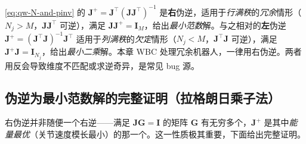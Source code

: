\begin{note}\label{note:qw-left-right}
\cref{eq:qw-N-and-pinv} 的 $\boldsymbol{J}^+=\boldsymbol{J}^\top(\boldsymbol{J}\boldsymbol{J}^\top)^{-1}$ 是\textbf{右}伪逆，适用于\emph{行满秩}的\emph{冗余}情形（$N_j>M$，$\boldsymbol{J}\boldsymbol{J}^\top$ 可逆），满足 $\boldsymbol{J}\boldsymbol{J}^+=\mathbf{I}_M$，给出\emph{最小范数}解。与之相对的\textbf{左}伪逆 $\boldsymbol{J}^+=(\boldsymbol{J}^\top\boldsymbol{J})^{-1}\boldsymbol{J}^\top$ 适用于\emph{列满秩}的\emph{欠定}情形（$N_j<M$，$\boldsymbol{J}^\top\boldsymbol{J}$ 可逆），满足 $\boldsymbol{J}^+\boldsymbol{J}=\mathbf{I}_{N_j}$，给出\emph{最小二乘}解。本章 WBC 处理冗余机器人，一律用右伪逆。两者用反会导致维度不匹配或求逆奇异，是常见 bug 源。
\end{note}

\subsection{伪逆为最小范数解的完整证明（拉格朗日乘子法）}
\label{subsec:qw-pinv-proof}

右伪逆并非随便一个右逆——满足 $\boldsymbol{J}\boldsymbol{G}=\mathbf{I}$ 的矩阵 $\boldsymbol{G}$ 有无穷多个，$\boldsymbol{J}^+$ 是其中\emph{能量最优}（关节速度模长最小）的那一个。这一性质极其重要，下面给出完整证明。

